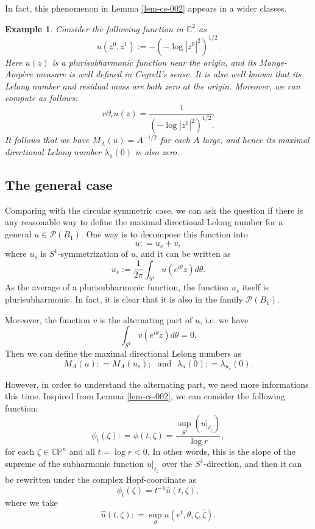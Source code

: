 \documentclass[a4paper,11pt]{amsart}
\numberwithin{equation}{section}
\newtheorem{example}[theorem]{Example}
\def\d{\partial}
\def\cP{{\mathcal P}}
\def\cP{{\mathcal P}}
\def\bC{{\mathbb C}}
\def\bP{{\mathbb P}}
\def\z{{\zeta}}
\def\l{{\ell}}
\begin{document}
In fact, this phenomenon in Lemma \ref{lem-cs-002} appears in a wider classes. 
\begin{example}
\label{exm-003}
Consider the following function in $\bC^2$ as 
\begin{equation}
\label{ex-017}
u(z^0,z^1):= -\left( -\log |z^0|^2 \right)^{1/2}. 
\end{equation}
Here $u(z)$ is a plurisubharmonic function near the origin, 
and its Monge-Amp\`ere measure is well defined in Cegrell's sense. 
It is also well known that its Lelong number and residual mass are both zero at the origin. 
Moreover, we can compute as follows:
\begin{equation}
\label{ex-018}
r\d_r u(z) = \frac{1}{\left( -\log |z^0|^2 \right)^{1/2}.  }
\end{equation}
It follows that we have $M_A(u) = A^{-1/2}$ for each $A$ large, 
and hence its maximal directional Lelong number $\lambda_u(0)$ is also zero. 
\end{example}




\subsection{The general case}
Comparing with the circular symmetric case, 
we can ask the question if there is any reasonable way 
to define the maximal directional Lelong number for a general $u\in \cP(B_1)$. 
One way is to decompose this function into 
$$ u: = u_s + v, $$
where $u_s$ is $S^1$-symmetrization of $u$, 
and it can be written as 
$$ u_s := \frac{1}{2\pi}\int_{S^1} u (e^{i\theta} z) d\theta.  $$
As the average of a plurisubharmonic function, 
the function $u_s$ itself is plurisubharmonic. 
In fact, it is clear that it is also in the family $\cP(B_1)$. 

Moreover, the function $v$ is the alternating part of $u$, i.e. 
we have 
$$ \int_{S^1} v (e^{i\theta} z) d\theta =0.  $$
Then we can define the maximal directional Lelong numbers as 
$$ M_A(u): = M_A(u_s); \ \ \ \mbox{and} \ \ \ \lambda_u(0): = \lambda_{u_s}(0).  $$

However, in order to understand the alternating part, 
we need more informations this time. 
Inspired from Lemma \ref{lem-cs-002},
we can consider the following function: 
\begin{equation}
\label{gc-000}
 \phi_t (\z): = \phi(t, \z)= \frac{\sup_{S^1} ( u|_{\l_{\z}} ) } {\log r},
 \end{equation}
for each $\z\in \bC\bP^n$ and all $t = \log r <0$. 
In other words, this is the slope of the supreme of the subharmonic function $u|_{\l_\z}$
over the $S^1$-direction, and then it can be rewritten under the complex Hopf-coordinate as 
\begin{equation}
\label{gc-001}
\phi_t(\z) =  t^{-1} \hat u (t, \z), 
\end{equation} 
where we take  
\begin{equation}
\label{gc-0011}
\hat u (t, \z): = \sup_{\theta} u(e^t, \theta, \z, \bar\z). 
\end{equation}
\end{document}
